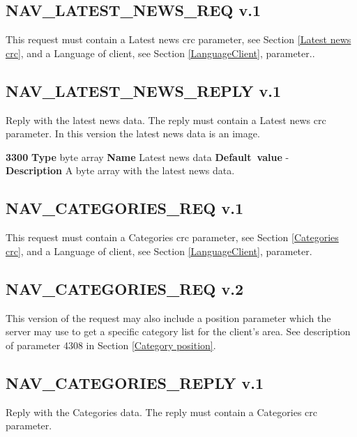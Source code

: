 \documentclass[a4paper]{article}
\begin{document}
\subsection{NAV\_LATEST\_NEWS\_REQ v.1}

This request must contain a Latest news crc parameter, see Section 
\ref{Latest news crc}, and a Language of client, see Section 
\ref{LanguageClient}, parameter..


\subsection{NAV\_LATEST\_NEWS\_REPLY v.1}

Reply with the latest news data. The reply must contain a Latest news crc
parameter. In this version the latest news data is an image.

\begin{list}{\textbf{ParamID}}{}
\item \textbf{3300} \textbf{Type} byte array \textbf{Name} Latest news data
                 \textbf{Default~value} - \\
  \label{Latest news data}
  \textbf{Description} A byte array with the latest news data.
\end{list}


\subsection{NAV\_CATEGORIES\_REQ v.1}

This request must contain a Categories crc parameter, see Section 
\ref{Categories crc}, and a Language of client, see Section 
\ref{LanguageClient}, parameter.

\subsection{NAV\_CATEGORIES\_REQ v.2}

This version of the request may also include a position parameter which the
server may use to get a specific category list for the client's area. See
description of parameter 4308 in Section \ref{Category position}.

\subsection{NAV\_CATEGORIES\_REPLY v.1}

Reply with the Categories data. The reply must contain a Categories crc
parameter.
\end{document}
